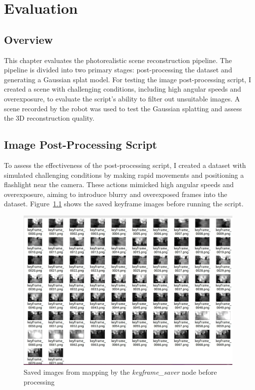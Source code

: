 \chapter{Evaluation} \label{evaluation}

\section{Overview}

This chapter evaluates the photorealistic scene reconstruction pipeline. The pipeline is divided into two primary stages: post-processing the dataset and generating a Gaussian splat model. For testing the image post-processing script, I created a scene with challenging conditions, including high angular speeds and overexposure, to evaluate the script's ability to filter out unsuitable images. A scene recorded by the robot was used to test the Gaussian splatting and assess the 3D reconstruction quality. 

\section{Image Post-Processing Script}

To assess the effectiveness of the post-processing script, I created a dataset with simulated challenging conditions by making rapid movements and positioning a flashlight near the camera. These actions mimicked high angular speeds and overexposure, aiming to introduce blurry and overexposed frames into the dataset. Figure~\ref{fig:keyframes_before_process} shows the saved keyframe images before running the script.

\FloatBarrier
\begin{figure}[htbp]
	\centering
	\includegraphics[width=150mm, keepaspectratio]{figures_jpg/keyframes_before_process.jpg}
	\caption{Saved images from mapping by the \textit{keyframe\_saver} node before processing}
	\label{fig:keyframes_before_process}
\end{figure}
\FloatBarrier

